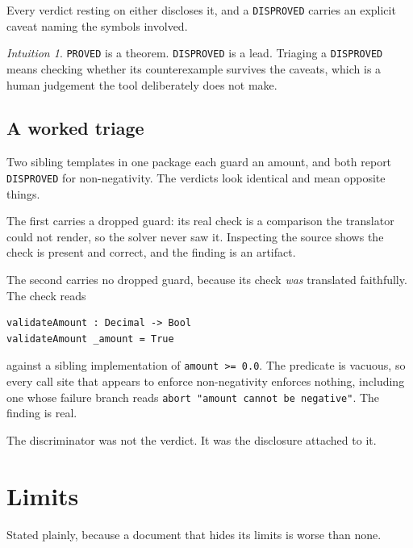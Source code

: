\documentclass[11pt,a4paper]{article}
\newcommand{\code}[1]{\texttt{#1}}
\theoremstyle{definition}
\theoremstyle{plain}
\theoremstyle{remark}
\newtheorem*{intuition}{Intuition}
\begin{document}
Every verdict resting on either discloses it, and a \code{DISPROVED} carries an
explicit caveat naming the symbols involved.

\begin{intuition}
\code{PROVED} is a theorem. \code{DISPROVED} is a lead. Triaging a
\code{DISPROVED} means checking whether its counterexample survives the
caveats, which is a human judgement the tool deliberately does not make.
\end{intuition}

\subsection{A worked triage}

Two sibling templates in one package each guard an amount, and both report
\code{DISPROVED} for non-negativity. The verdicts look identical and mean
opposite things.

The first carries a dropped guard: its real check is a comparison the
translator could not render, so the solver never saw it. Inspecting the source
shows the check is present and correct, and the finding is an artifact.

The second carries no dropped guard, because its check \emph{was} translated
faithfully. The check reads
\begin{lstlisting}
validateAmount : Decimal -> Bool
validateAmount _amount = True
\end{lstlisting}
against a sibling implementation of \code{amount >= 0.0}. The predicate is
vacuous, so every call site that appears to enforce non-negativity enforces
nothing, including one whose failure branch reads \code{abort "amount cannot be
negative"}. The finding is real.

The discriminator was not the verdict. It was the disclosure attached to it.

\section{Limits}

Stated plainly, because a document that hides its limits is worse than none.
\end{document}
